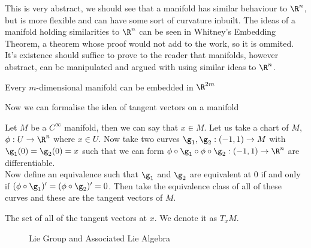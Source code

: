 \noindent
This is very abstract, we should see that a manifold has similar behaviour to $\R^n$, but is more flexible and can have some sort of curvature inbuilt. The ideas of a manifold holding similarities to $\R^n$ can be seen in Whitney's Embedding Theorem, a theorem whose proof would not add to the work, so it is ommited. It's existence should suffice to prove to the reader that manifolds, however abstract, can be manipulated and argued with using similar ideas to $\R^n$.

\begin{nthm}
  Every $m$-dimensional manifold can be embedded in $\R^{2m}$
\end{nthm}

\noindent
Now we can formalise the idea of tangent vectors on a manifold~\cite{Lee-2009}
\begin{ndefi}
  Let $M$ be a $C^\infty$ manifold, then we can say that $x \in M$. Let us take a chart of $M$, $\phi : U \to \R^n$ where $x \in U$. Now take two curves $\g_1, \g_2 : (-1, 1) \to M$ with $\g_1(0) = \g_2(0) = x$ such that we can form $\phi \circ \g_1 \circ \phi \circ \g_2 : (-1, 1) \to \R^n$ are differentiable. \\
  Now define an equivalence such that $\g_1$ and $\g_2$ are equivalent at $0$ if and only if $(\phi \circ \g_1)' = (\phi \circ \g_2)' = 0$. Then take the equivalence class of all of these curves and these are the tangent vectors of $M$.
\end{ndefi}

\begin{ndefi}
  The set of all of the tangent vectors at $x$. We denote it as $T_x M$.
\end{ndefi}

\begin{figure}[!ht]
\centering
{}
\caption{Lie Group and Associated Lie Algebra}
\label{fig:1}
\end{figure}

